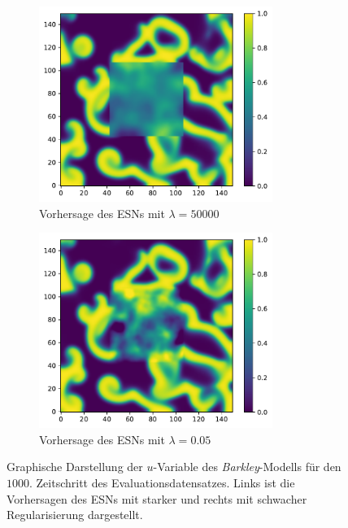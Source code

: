 \begin{figure}[h]
	\centering
	\begin{subfigure}{.5\textwidth}
		\centering
		\includegraphics[height=2.5in]{figures/results/inner_cross_prediction/barkley_u_inner_esn_high_penalty.pdf}
		\setcapmargin[1cm]{0.5cm}
		\caption{Vorhersage des \textsc{ESN}s mit $\lambda=50000$}
	\end{subfigure}%
	\begin{subfigure}{.5\textwidth}
		\centering
		\includegraphics[height=2.5in]{figures/results/inner_cross_prediction/barkley_u_inner_esn_low_penalty.pdf}
		\setcapmargin[1cm]{0.5cm}
  		\caption{Vorhersage des \textsc{ESN}s mit $\lambda=0.05$}
	\end{subfigure}
	\caption{Graphische Darstellung der $u$-Variable des \textit{Barkley}-Modells für den $1000$. Zeitschritt des Evaluationsdatensatzes. Links ist die Vorhersagen des \textsc{ESN}s mit starker und rechts mit schwacher Regularisierung dargestellt.}
	\label{fig:exp_inner_cross_barkley_esn_comparison}
\end{figure} 

